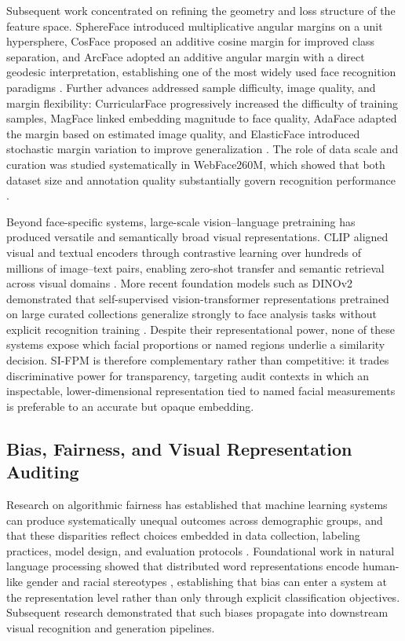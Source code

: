 \documentclass{article}
\begin{document}
Subsequent work concentrated on refining the geometry and loss structure of the feature space. SphereFace introduced multiplicative angular margins on a unit hypersphere, CosFace proposed an additive cosine margin for improved class separation, and ArcFace adopted an additive angular margin with a direct geodesic interpretation, establishing one of the most widely used face recognition paradigms \cite{liu2017sphereface,wang2018cosface,deng2019arcface}. Further advances addressed sample difficulty, image quality, and margin flexibility: CurricularFace progressively increased the difficulty of training samples, MagFace linked embedding magnitude to face quality, AdaFace adapted the margin based on estimated image quality, and ElasticFace introduced stochastic margin variation to improve generalization \cite{huang2020curricularface,meng2021magface,kim2022adaface,boutros2022elasticface}. The role of data scale and curation was studied systematically in WebFace260M, which showed that both dataset size and annotation quality substantially govern recognition performance \cite{zhu2021webface260m}.

Beyond face-specific systems, large-scale vision–language pretraining has produced versatile and semantically broad visual representations. CLIP aligned visual and textual encoders through contrastive learning over hundreds of millions of image–text pairs, enabling zero-shot transfer and semantic retrieval across visual domains \cite{pmlr-v139-radford21a}. More recent foundation models such as DINOv2 demonstrated that self-supervised vision-transformer representations pretrained on large curated collections generalize strongly to face analysis tasks without explicit recognition training \cite{oquab2023dinov2}.
Despite their representational power, none of these systems expose which facial proportions or named regions underlie a similarity decision. SI-FPM is therefore complementary rather than competitive: it trades discriminative power for transparency, targeting audit contexts in which an inspectable, lower-dimensional representation tied to named facial measurements is preferable to an accurate but opaque embedding.

\subsection{Bias, Fairness, and Visual Representation Auditing}

Research on algorithmic fairness has established that machine learning systems can produce systematically unequal outcomes across demographic groups, and that these disparities reflect choices embedded in data collection, labeling practices, model design, and evaluation protocols \cite{mehrabi2021survey}. Foundational work in natural language processing showed that distributed word representations encode human-like gender and racial stereotypes \cite{bolukbasi2016debiasing}, establishing that bias can enter a system at the representation level rather than only through explicit classification objectives. Subsequent research demonstrated that such biases propagate into downstream visual recognition and generation pipelines.
\end{document}
